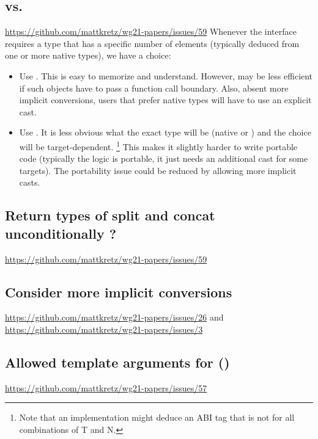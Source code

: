 \subsection{ vs. }
\url{https://github.com/mattkretz/wg21-papers/issues/59}
Whenever the interface requires a \simd type that has a specific number of elements (typically deduced from one or more native types), we have a choice:
\begin{itemize}
  \item Use \fixedsizeN.
    This is easy to memorize and understand.
    However, \fixedsizeN may be less efficient if such objects have to pass a function call boundary.
    Also, absent more implicit conversions, users that prefer native types will have to use an explicit cast.
  \item Use .
    It is less obvious what the exact type will be (native or \fixedsizeN) and the choice will be target-dependent.%
    \footnote{Note that an implementation might deduce an ABI tag that is not \fixedsizeN for all combinations of \type T and \code N.}
    This makes it slightly harder to write portable code (typically the logic is portable, it just needs an additional cast for some targets).
    The portability issue could be reduced by allowing more implicit casts.
\end{itemize}

\subsection{Return types of split and concat unconditionally \fixedsizeN?}
\url{https://github.com/mattkretz/wg21-papers/issues/59}

\subsection{Consider more implicit conversions}
\url{https://github.com/mattkretz/wg21-papers/issues/26} and \url{https://github.com/mattkretz/wg21-papers/issues/3}

\subsection{Allowed template arguments for ()}
\url{https://github.com/mattkretz/wg21-papers/issues/57}

